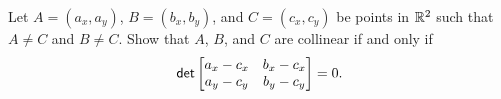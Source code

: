 \begin{exercise}
Let \(A = (a_x,a_y)\), \(B = (b_x,b_y)\), and \(C = (c_x,c_y)\) be points in \(\mathbb{R}^2\) such that \(A \neq C\) and \(B \neq C\).
Show that \(A\), \(B\), and \(C\) are collinear if and only if \[ \mathsf{det} \begin{bmatrix} a_x - c_x & b_x - c_x \\ a_y - c_y & b_y - c_y \end{bmatrix} = 0. \]
\end{exercise}
